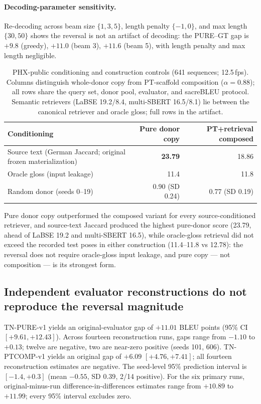 \documentclass[pdflatex,sn-chicago]{sn-jnl}
\begin{document}
\paragraph{Decoding-parameter sensitivity.}
Re-decoding across beam size $\{1,3,5\}$, length penalty $\{-1,0\}$, and max length $\{30,50\}$ shows the reversal is not an artifact of decoding: the PURE--GT gap is $+9.8$ (greedy), $+11.0$ (beam 3), $+11.6$ (beam 5), with length penalty and max length negligible.

\begin{table}[t]
\centering
\small
\caption{PHX-public conditioning and construction controls (641 sequences; 12.5\,fps). Columns distinguish whole-donor copy from PT-scaffold composition ($\alpha{=}0.88$); all rows share the query set, donor pool, evaluator, and sacreBLEU protocol. Semantic retrievers (LaBSE 19.2/8.4, multi-SBERT 16.5/8.1) lie between the canonical retriever and oracle gloss; full rows in the artifact.}
\label{tab:isomorphic_conditioning}
\begin{tabular}{lrr}
\toprule
Conditioning & Pure donor copy & PT+retrieval composed \\
\midrule
Source text (German Jaccard; original frozen materialization) & \textbf{23.79} & 18.86 \\
Oracle gloss (input leakage) & 11.4 & 11.8 \\
Random donor (seeds 0--19) & 0.90 (SD 0.24) & 0.77 (SD 0.19) \\
\bottomrule
\end{tabular}
\end{table}

Pure donor copy outperformed the composed variant for every source-conditioned retriever, and source-text Jaccard produced the highest pure-donor score (23.79, ahead of LaBSE 19.2 and multi-SBERT 16.5), while oracle-gloss retrieval did not exceed the recorded test poses in either construction (11.4--11.8 vs 12.78): the reversal does not require oracle-gloss input leakage, and pure copy --- not composition --- is its strongest form.



\subsection{Independent evaluator reconstructions do not reproduce the reversal magnitude}
\label{sec:what-drives-reversal}
TN-PURE-v1 yields an original-evaluator gap of $+11.01$ BLEU points (95\% CI $[+9.61,+12.43]$). Across fourteen reconstruction runs, gaps range from $-1.10$ to $+0.13$; twelve are negative, two are near-zero positive (seeds 101, 606). TN-PTCOMP-v1 yields an original gap of $+6.09$ $[+4.76,+7.41]$; all fourteen reconstruction estimates are negative. The seed-level 95\% prediction interval is $[-1.4,+0.3]$ (mean $-0.55$, SD $0.39$, 2/14 positive). For the six primary runs, original-minus-run difference-in-differences estimates range from $+10.89$ to $+11.99$; every 95\% interval excludes zero.
\end{document}
